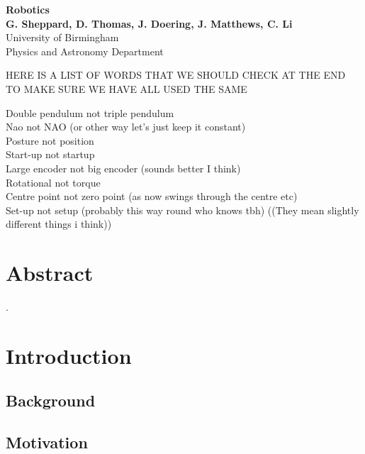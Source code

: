 \documentclass[11pt]{article}
\begin{document}
\begin{titlepage}

    \begin{center}
        \vspace*{1cm}
        \Huge
        \textbf{Robotics} \\
        \vspace{0.5cm}
        \LARGE
        \vspace{1.5cm}
        \textbf{G. Sheppard, D. Thomas, J. Doering, J. Matthews, C. Li} \\
        \vfill
        \vspace{0.8cm}
        \Large
        University of Birmingham\\
        Physics and Astronomy Department\\
    \end{center}
\end{titlepage}

\tableofcontents

HERE IS A LIST OF WORDS THAT WE SHOULD CHECK AT THE END TO MAKE SURE WE HAVE ALL USED THE SAME

Double pendulum not triple pendulum \\
Nao not NAO (or other way let's just keep it constant)\\
Posture not position\\
Start-up not startup\\
Large encoder not big encoder (sounds better I think)\\
Rotational not torque\\
Centre point not zero point (as now swings through the centre etc)\\
Set-up not setup (probably this way round who knows tbh) ((They mean slightly different things i think))


\section{Abstract}
\cite{Bae2006}.

\section{Introduction}
\subsection{Background}
\subsection{Motivation}
\end{document}
